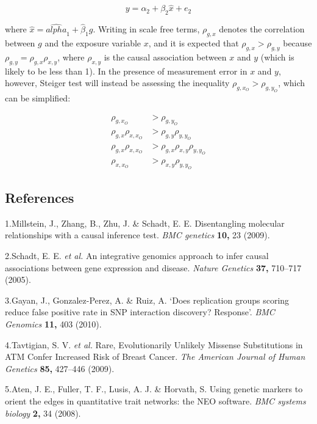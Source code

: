 \documentclass[]{article}
\begin{document}
\[
y = \alpha_2 + \beta_2 \hat{x} + e_2
\]

where \(\hat{x} = \hat{alpha}_1 + \hat{\beta}_1 g\). Writing in scale
free terms, \(\rho_{g, x}\) denotes the correlation between \(g\) and
the exposure variable \(x\), and it is expected that
\(\rho_{g, x} > \rho_{g, y}\) because
\(\rho_{g, y} = \rho_{g, x}\rho_{x, y}\), where \(\rho_{x, y}\) is the
causal association between \(x\) and \(y\) (which is likely to be less
than 1). In the presence of measurement error in \(x\) and \(y\),
however, Steiger test will instead be assessing the inequality
\(\rho_{g, x_O} > \rho_{g, y_O}\), which can be simplified:

\[
\begin{aligned}
\rho_{g, x_O} & > \rho_{g, y_O} \\
\rho_{g, x} \rho_{x, x_O} & > \rho_{g,y}\rho_{y,y_O}\\
\rho_{g, x} \rho_{x, x_O} & > \rho_{g,x}\rho_{x,y}\rho_{y,y_O}\\
\rho_{x, x_O} & > \rho_{x,y}\rho_{y,y_O}
\end{aligned}
\]

\newpage

\subsection*{References}\label{references}

1.Millstein, J., Zhang, B., Zhu, J. \& Schadt, E. E. Disentangling
molecular relationships with a causal inference test. \emph{BMC
genetics} \textbf{10,} 23 (2009).

2.Schadt, E. E. \emph{et al.} An integrative genomics approach to infer
causal associations between gene expression and disease. \emph{Nature
Genetics} \textbf{37,} 710--717 (2005).

3.Gayan, J., Gonzalez-Perez, A. \& Ruiz, A. `Does replication groups
scoring reduce false positive rate in SNP interaction discovery?
Response'. \emph{BMC Genomics} \textbf{11,} 403 (2010).

4.Tavtigian, S. V. \emph{et al.} Rare, Evolutionarily Unlikely Missense
Substitutions in ATM Confer Increased Risk of Breast Cancer. \emph{The
American Journal of Human Genetics} \textbf{85,} 427--446 (2009).

5.Aten, J. E., Fuller, T. F., Lusis, A. J. \& Horvath, S. Using genetic
markers to orient the edges in quantitative trait networks: the NEO
software. \emph{BMC systems biology} \textbf{2,} 34 (2008).
\end{document}

